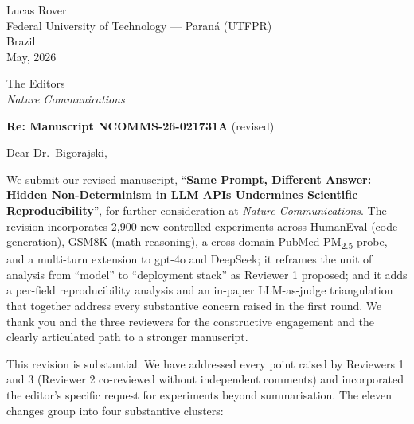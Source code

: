 \documentclass[11pt,a4paper]{article}
\begin{document}
\begin{flushright}
Lucas Rover\\
Federal University of Technology --- Paraná (UTFPR)\\
Brazil\\

\bigskip
May, 2026
\end{flushright}

\bigskip

\noindent The Editors\\
\emph{Nature Communications}\\

\bigskip

\noindent\textbf{Re: Manuscript NCOMMS-26-021731A} (revised)

\bigskip

Dear Dr.\ Bigorajski,

We submit our revised manuscript, ``\textbf{Same Prompt, Different Answer: Hidden Non-Determinism in LLM APIs Undermines Scientific Reproducibility}'', for further consideration at \emph{Nature Communications}. The revision incorporates 2{,}900 new controlled experiments across HumanEval (code generation), GSM8K (math reasoning), a cross-domain PubMed PM\textsubscript{2.5} probe, and a multi-turn extension to gpt-4o and DeepSeek; it reframes the unit of analysis from ``model'' to ``deployment stack'' as Reviewer 1 proposed; and it adds a per-field reproducibility analysis and an in-paper LLM-as-judge triangulation that together address every substantive concern raised in the first round. We thank you and the three reviewers for the constructive engagement and the clearly articulated path to a stronger manuscript.

This revision is substantial. We have addressed every point raised by Reviewers 1 and 3 (Reviewer 2 co-reviewed without independent comments) and incorporated the editor's specific request for experiments beyond summarisation. The eleven changes group into four substantive clusters:
\end{document}
